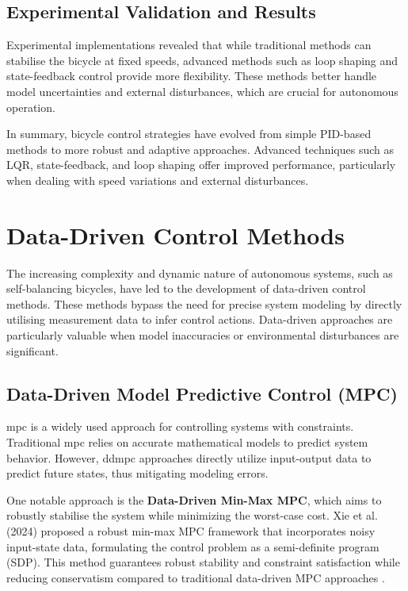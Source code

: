 \subsection{Experimental Validation and Results}
Experimental implementations revealed that while traditional methods can stabilise the bicycle at fixed speeds, advanced methods such as loop shaping and state-feedback control provide more flexibility. These methods better handle model uncertainties and external disturbances, which are crucial for autonomous operation.

In summary, bicycle control strategies have evolved from simple PID-based methods to more robust and adaptive approaches. Advanced techniques such as LQR, state-feedback, and loop shaping offer improved performance, particularly when dealing with speed variations and external disturbances.

\section{Data-Driven Control Methods}

The increasing complexity and dynamic nature of autonomous systems, such as self-balancing bicycles, have led to the development of data-driven control methods. These methods bypass the need for precise system modeling by directly utilising measurement data to infer control actions. Data-driven approaches are particularly valuable when model inaccuracies or environmental disturbances are significant.

\subsection{Data-Driven Model Predictive Control (MPC)}
\gls{mpc} is a widely used approach for controlling systems with constraints. Traditional \gls{mpc} relies on accurate mathematical models to predict system behavior. However, \gls{ddmpc} approaches directly utilize input-output data to predict future states, thus mitigating modeling errors.

One notable approach is the \textbf{Data-Driven Min-Max MPC}, which aims to robustly stabilise the system while minimizing the worst-case cost. Xie et al. (2024) proposed a robust min-max MPC framework that incorporates noisy input-state data, formulating the control problem as a semi-definite program (SDP). This method guarantees robust stability and constraint satisfaction while reducing conservatism compared to traditional data-driven MPC approaches \cite{xie2024}.

